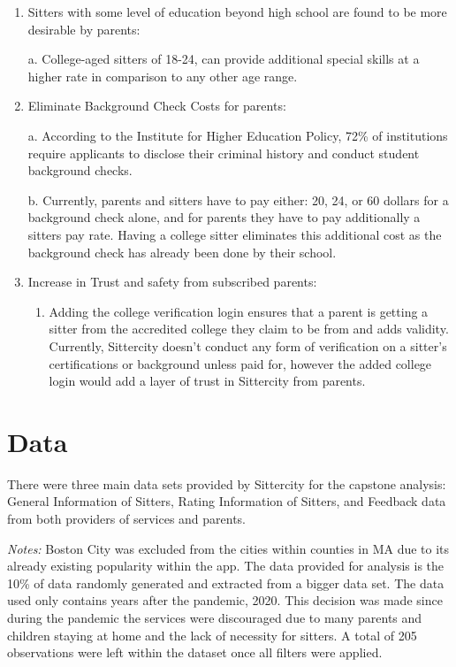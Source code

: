 \documentclass[12pt]{article}
\providecommand{\tightlist}{%
  \setlength{\itemsep}{0pt}\setlength{\parskip}{0pt}}
\begin{document}
\begin{enumerate}
\def\labelenumi{\arabic{enumi}.}
\item
  Sitters with some level of education beyond high school are found to
  be more desirable by parents:

  a. College-aged sitters of 18-24, can provide additional special
  skills at a higher rate in comparison to any other age range.\\
\item
  Eliminate Background Check Costs for parents:

  a. According to the Institute for Higher Education Policy, 72\% of
  institutions require applicants to disclose their criminal history and
  conduct student background checks.

  b. Currently, parents and sitters have to pay either: 20, 24, or 60
  dollars for a background check alone, and for parents they have to pay
  additionally a sitters pay rate. Having a college sitter eliminates
  this additional cost as the background check has already been done by
  their school.
\item
  Increase in Trust and safety from subscribed parents:

  \begin{enumerate}
  \def\labelenumii{\alph{enumii}.}
  \tightlist
  \item
    Adding the college verification login ensures that a parent is
    getting a sitter from the accredited college they claim to be from
    and adds validity. Currently, Sittercity doesn't conduct any form of
    verification on a sitter's certifications or background unless paid
    for, however the added college login would add a layer of trust in
    Sittercity from parents.
  \end{enumerate}
\end{enumerate}

\newpage

\hypertarget{data}{%
\section{Data}\label{data}}

There were three main data sets provided by Sittercity for the capstone
analysis: General Information of Sitters, Rating Information of Sitters,
and Feedback data from both providers of services and parents.

\emph{Notes:} Boston City was excluded from the cities within counties
in MA due to its already existing popularity within the app. The data
provided for analysis is the 10\% of data randomly generated and
extracted from a bigger data set. The data used only contains years
after the pandemic, 2020. This decision was made since during the
pandemic the services were discouraged due to many parents and children
staying at home and the lack of necessity for sitters. A total of 205
observations were left within the dataset once all filters were applied.
\end{document}
